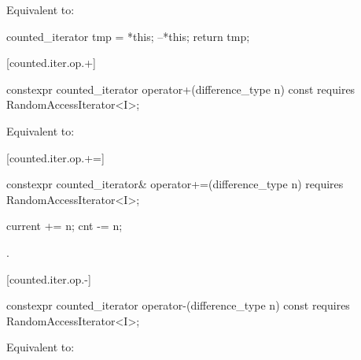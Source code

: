 \begin{itemdescr}
\pnum
\effects Equivalent to:
\begin{codeblock}
counted_iterator tmp = *this;
--*this;
return tmp;
\end{codeblock}
\end{itemdescr}

[counted.iter.op.+]{}

%
%
\begin{itemdecl}
  constexpr counted_iterator operator+(difference_type n) const
    requires RandomAccessIterator<I>;
\end{itemdecl}

\begin{itemdescr}
\pnum
\requires {}

\pnum
\effects Equivalent to:
\end{itemdescr}

[counted.iter.op.+=]{}

%
%
\begin{itemdecl}
  constexpr counted_iterator& operator+=(difference_type n)
    requires RandomAccessIterator<I>;
\end{itemdecl}

\begin{itemdescr}
\pnum
\requires {}

\pnum
\effects
\begin{codeblock}
current += n;
cnt -= n;
\end{codeblock}

\pnum
\returns {}.
\end{itemdescr}

[counted.iter.op.-]{}

%
%
\begin{itemdecl}
  constexpr counted_iterator operator-(difference_type n) const
    requires RandomAccessIterator<I>;
\end{itemdecl}

\begin{itemdescr}
\pnum
\requires {}

\pnum
\effects Equivalent to:
\end{itemdescr}

